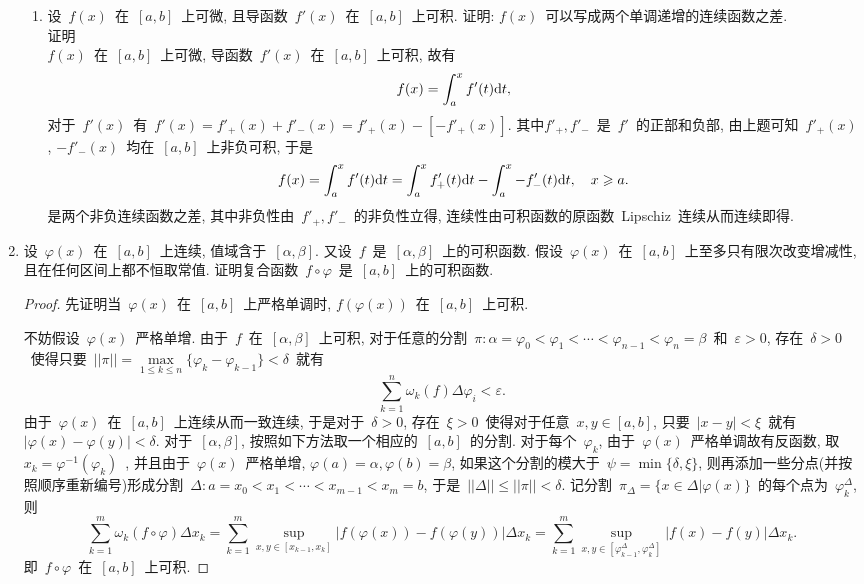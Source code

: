 \documentclass[UTF8,a4paper,20pt]{article}
\begin{document}
\begin{enumerate}
\begin{enumerate}[(1)]
	\item 设~$f(x)$~在~$[a,b]$~上可微, 且导函数~$f'(x)$~在~$[a,b]$~上可积. 证明: $f(x)$~可以写成两个单调递增的连续函数之差.\\
	{\heiti 证明}\\
	$f(x)$~在~$[a,b]$~上可微, 导函数~$f'(x)$~在~$[a,b]$~上可积, 故有
	\[f(x)=\int_a^x f'(t)\mathrm{d}t,\]
对于~$f'(x)$~有~$f'(x)=f'_{+}(x)+f'_{-}(x)=f'_{+}(x)-[-f'_{+}(x)]$. 其中$f'_{+}, f'_{-}$~是~$f'$~的正部和负部, 由上题可知~$f'_{+}(x)$, $-f'_{-}(x)$~均在~$[a,b]$~上非负可积, 于是
	\[f(x)=\int_a^x f'(t)\mathrm{d}t=\int_a^x f'_{+}(t)\mathrm{d}t-\int_a^x -f'_{-}(t)\mathrm{d}t, \quad x\geqslant a. \]
是两个非负连续函数之差, 其中非负性由~$f'_{+}, f'_{-}$~的非负性立得, 连续性由可积函数的原函数~Lipschiz~连续从而连续即得.
	\end{enumerate}

\item 设~$\varphi(x)$~在~$[a,b]$~上连续, 值域含于~$[\alpha,\beta]$. 又设~$f$~是~$[\alpha,\beta]$~上的可积函数. 假设~$\varphi(x)$~在~$[a,b]$~上至多只有限次改变增减性, 且在任何区间上都不恒取常值. 证明复合函数~$f\circ \varphi$~是~$[a,b]$~上的可积函数.
\begin{proof}
	先证明当~$\varphi(x)$~在~$[a,b]$~上严格单调时, $f(\varphi(x))$~在~$[a,b]$~上可积.

	不妨假设~$\varphi(x)$~严格单增. 由于~$f$~在~$[\alpha, \beta]$~上可积, 对于任意的分割~$\pi: \alpha=\varphi_0<\varphi_1<\cdots<\varphi_{n-1}<\varphi_n=\beta$~和~$\varepsilon>0$, 存在~$\delta>0$~使得只要~$||\pi||=\max\limits_{1\leqslant k\leqslant n}\{\varphi_k-\varphi_{k-1}\}<\delta$~就有
	\[\sum_{k=1}^n\omega_k(f)\Delta\varphi_i<\varepsilon.\]
由于~$\varphi(x)$~在~$[a,b]$~上连续从而一致连续, 于是对于~$\delta>0$, 存在~$\xi>0$~使得对于任意~$x,y\in[a,b]$, 只要~$|x-y|<\xi$~就有~$|\varphi(x)-\varphi(y)|<\delta$. 对于~$[\alpha, \beta]$, 按照如下方法取一个相应的~$[a,b]$~的分割. 对于每个~$\varphi_k$, 由于~$\varphi(x)$~严格单调故有反函数, 取~$x_k=\varphi^{-1}(\varphi_k)$~, 并且由于~$\varphi(x)$~严格单增, $\varphi(a)=\alpha, \varphi(b)=\beta$, 如果这个分割的模大于~$\psi=\min\{\delta, \xi\}$, 则再添加一些分点(并按照顺序重新编号)形成分割~$\Delta: a=x_0<x_1<\cdots<x_{m-1}<x_m=b$, 于是~$||\Delta||\leqslant||\pi||<\delta$. 记分割~$\pi_{\Delta}=\{x\in\Delta|\varphi(x)\}$~的每个点为~$\varphi_k^{\Delta}$, 则
	\[\sum_{k=1}^m\omega_k(f\circ\varphi)\Delta x_k=\sum_{k=1}^m\sup_{x,y\in [x_{k-1},x_k]}|f(\varphi(x))-f(\varphi(y))|\Delta x_k=\sum_{k=1}^m\sup_{x,y\in [\varphi_{k-1}^{\Delta}, \varphi_k^{\Delta}]}|f(x)-f(y)|\Delta x_k.\]
即~$f\circ\varphi$~在~$[a,b]$~上可积.
\end{proof}


\end{enumerate}
\end{document}
